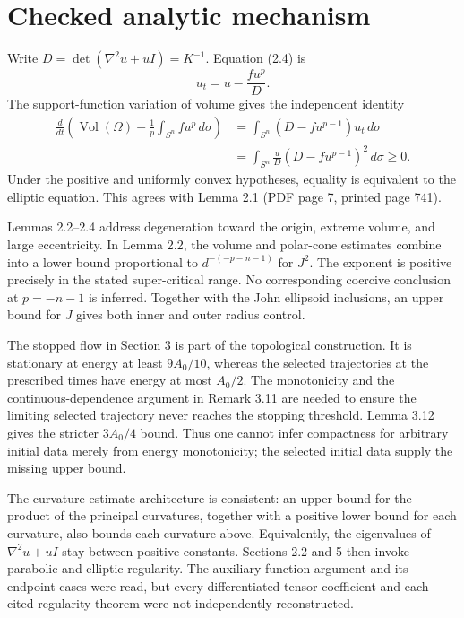 \documentclass[10pt]{article}
\begin{document}
\section*{Checked analytic mechanism}
Write \(D=\det(\nabla^2u+uI)=K^{-1}\). Equation (2.4) is \[u_t=u-\frac{fu^p}{D}.\] The support-function variation of volume gives the independent identity \[\begin{aligned}
\frac{d}{dt}\left(\operatorname{Vol}(\Omega)
      -\frac1p\int_{S^n}fu^p\,d\sigma\right)
 &=\int_{S^n}(D-fu^{p-1})u_t\,d\sigma\\
 &=\int_{S^n}\frac{u}{D}(D-fu^{p-1})^2\,d\sigma\geq0.\end{aligned}\] Under the positive and uniformly convex hypotheses, equality is equivalent to the elliptic equation. This agrees with Lemma 2.1 (PDF page 7, printed page 741).\par
Lemmas 2.2–2.4 address degeneration toward the origin, extreme volume, and large eccentricity. In Lemma 2.2, the volume and polar-cone estimates combine into a lower bound proportional to \(d^{-(-p-n-1)}\) for \(J^2\). The exponent is positive precisely in the stated super-critical range. No corresponding coercive conclusion at \(p=-n-1\) is inferred. Together with the John ellipsoid inclusions, an upper bound for \(J\) gives both inner and outer radius control.\par
The stopped flow in Section 3 is part of the topological construction. It is stationary at energy at least \(9A_0/10\), whereas the selected trajectories at the prescribed times have energy at most \(A_0/2\). The monotonicity and the continuous-dependence argument in Remark 3.11 are needed to ensure the limiting selected trajectory never reaches the stopping threshold. Lemma 3.12 gives the stricter \(3A_0/4\) bound. Thus one cannot infer compactness for arbitrary initial data merely from energy monotonicity; the selected initial data supply the missing upper bound.\par
The curvature-estimate architecture is consistent: an upper bound for the product of the principal curvatures, together with a positive lower bound for each curvature, also bounds each curvature above. Equivalently, the eigenvalues of \(\nabla^2u+uI\) stay between positive constants. Sections 2.2 and 5 then invoke parabolic and elliptic regularity. The auxiliary-function argument and its endpoint cases were read, but every differentiated tensor coefficient and each cited regularity theorem were not independently reconstructed.\par
\end{document}
